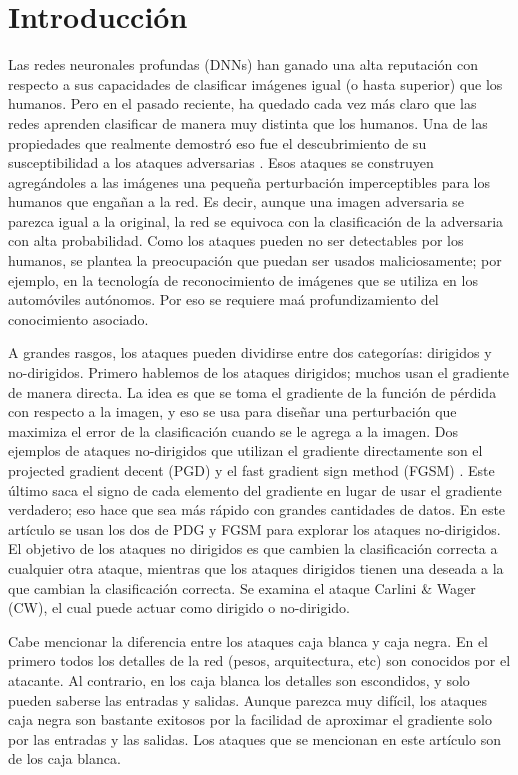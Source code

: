 \section{Introducción}

Las redes neuronales profundas (DNNs) han ganado una alta reputación con respecto a sus capacidades de clasificar imágenes igual (o hasta superior) que los humanos. Pero en el pasado reciente, ha quedado cada vez más claro que las redes aprenden clasificar de manera muy distinta que los humanos. Una de las propiedades que realmente demostró eso fue el descubrimiento de su susceptibilidad a los ataques adversarias \cite{szegedy2014intriguing}. Esos ataques se construyen agregándoles a las imágenes una pequeña perturbación imperceptibles para los humanos que engañan a la red. Es decir, aunque una imagen adversaria se parezca igual a la original, la red se equivoca con la clasificación de la adversaria con alta probabilidad. Como los ataques pueden no ser detectables por los humanos, se plantea la preocupación que puedan ser usados maliciosamente; por ejemplo, en la tecnología de reconocimiento de imágenes que se utiliza en los automóviles autónomos. Por eso se requiere maá profundizamiento del conocimiento asociado. 

A grandes rasgos, los ataques pueden dividirse entre dos categorías: dirigidos y no-dirigidos. Primero hablemos de los ataques dirigidos; muchos usan el gradiente de manera directa. La idea es que se toma el gradiente de la función de pérdida con respecto a la imagen, y eso se usa para diseñar una perturbación que maximiza el error de la clasificación cuando se le agrega a la imagen. Dos ejemplos de ataques no-dirigidos que utilizan el gradiente directamente son el projected gradient decent (PGD) \cite{madry2019deep} y el fast gradient sign method (FGSM) \cite{goodfellow2015explaining}. Este último saca el signo de cada elemento del gradiente en lugar de usar el gradiente verdadero; eso hace que sea más rápido con grandes cantidades de datos. En este artículo se usan los dos de PDG y FGSM para explorar los ataques no-dirigidos. El objetivo de los ataques no dirigidos es que cambien la clasificación correcta a cualquier otra ataque, mientras que los ataques dirigidos tienen una deseada a la que cambian la clasificación correcta. Se examina el ataque Carlini \& Wager (CW), el cual puede actuar como dirigido o no-dirigido. 

Cabe mencionar la diferencia entre los ataques caja blanca y caja negra. En el primero todos los detalles de la red (pesos, arquitectura, etc) son conocidos por el atacante. Al contrario, en los caja blanca los detalles son escondidos, y solo pueden saberse las entradas y salidas. Aunque parezca muy difícil, los ataques caja negra son bastante exitosos por la facilidad de aproximar el gradiente solo por las entradas y las salidas. Los ataques que se mencionan en este artículo son de los caja blanca.

